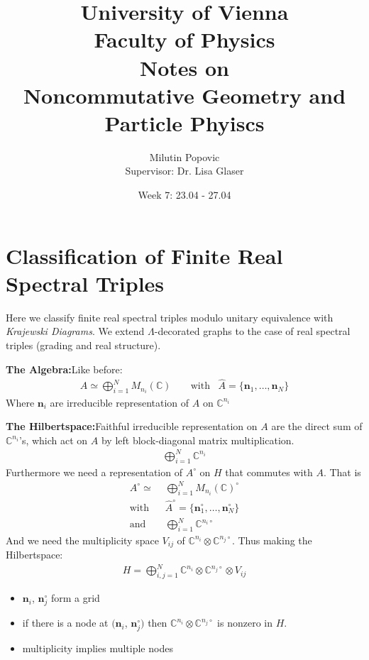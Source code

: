 \documentclass[a4paper]{article}
\title{University of Vienna\\ Faculty of Physics\\ \vspace{1.25cm}
Notes on\\ Noncommutative Geometry and Particle Phyiscs}
\author{Milutin Popovic \\ Supervisor: Dr. Lisa
Glaser}
\date{Week 7: 23.04 - 27.04}
\theoremstyle{definition}
\theoremstyle{definition}
\theoremstyle{definition}
\theoremstyle{theorem}
\theoremstyle{theorem}
\theoremstyle{theorem}
\begin{document}
    \maketitle
    \tableofcontents
    \newpage
\section{Classification of Finite Real Spectral Triples}

Here we classify finite real spectral triples modulo unitary equivalence with
\textit{Krajewski Diagrams}. We extend $\Lambda$-decorated graphs to the case of
real spectral triples (grading and real structure).

\textbf{The Algebra:}Like before:
\begin{align}
    A\simeq \bigoplus_{i=1}^N M_{n_i}(\mathbb{C}) \;\;\;\;\;\;\; \text{with} \;\;\; \hat{A} = \{\textbf{n}_1, \dots, \textbf{n}_N\}
\end{align}
Where $\textbf{n}_i$ are irreducible representation of $A$ on
$\mathbb{C}^{n_i}$

\textbf{The Hilbertspace:}Faithful irreducible representation on $A$ are the
direct sum of $\mathbb{C}^{n_i}$'s, which act on $A$ by left block-diagonal
matrix multiplication.
\begin{align}
    \bigoplus_{i=1}^N \mathbb{C}^{n_i}
\end{align}
Furthermore we need a representation of $A^\circ$ on $H$ that commutes with
$A$. That is
\begin{align}
    A^\circ \simeq &\bigoplus_{i=1}^N M_{n_i}(\mathbb{C})^\circ \\
        \text{with} \;\;\; &\hat{A}^\circ = \{\textbf{n}_1^\circ, \dots,
    \textbf{n}_N^\circ\} \\
    \text{and} \;\;\;  &\bigoplus_{i=1}^N \mathbb{C}^{n_i\circ}
\end{align}
And we need the multiplicity space $V_{ij}$ of $\mathbb{C}^{n_i} \otimes
\mathbb{C}^{n_j\circ}$.
Thus making the Hilbertspace:
\begin{align}
    H=\bigoplus_{i,j=1}^N \mathbb{C}^{n_i} \otimes \mathbb{C}^{n_j\circ}
    \otimes V_{ij}
\end{align}
\begin{itemize}
    \item $\textbf{n}_i$, $\textbf{n}_j^\circ$ form a grid
    \item if there is a node at $(\textbf{n}_i$, $\textbf{n}_j^\circ)$ then
            $\mathbb{C}^{n_i} \otimes \mathbb{C}^{n_j\circ}$ is nonzero in $H$.
    \item multiplicity implies multiple nodes
\end{itemize}
\end{document}
